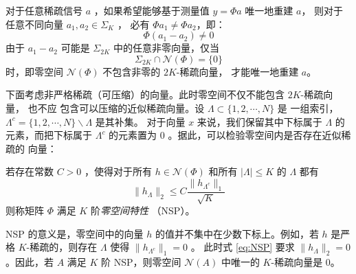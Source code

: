 对于任意稀疏信号 $a$ ，如果希望能够基于测量值 $y = \Phi a$ 唯一地重建 $a$，
则对于任意不同向量 $a_1, a_2 \in \Sigma_K$ ，
必有 $\Phi a_1 \neq \Phi a_2$，即：
\begin{equation}
\Phi (a_1 - a_2) \neq 0
\end{equation}
由于 $a_1 - a_2$ 可能是 $\Sigma_{2K}$ 中的任意非零向量，仅当
\begin{equation}
\Sigma_{2K} \cap \mathcal{N}(\Phi) = \{0\}
\end{equation}
时，即零空间 $\mathcal{N}(\Phi)$ 不包含非零的 $2K$-稀疏向量，
才能唯一地重建 $a$。

下面考虑非严格稀疏（可压缩）的向量。此时零空间不仅不能包含 $2K$-稀疏向量，
也不应
包含可以压缩的近似稀疏向量。设 $\Lambda \subset \{1, 2, \cdots, N\}$ 是
一组索引， $\Lambda^c = \{1,2,\cdots,N\} \backslash \Lambda$ 是其补集。
对于向量 $x$ 来说，我们保留其中下标属于 $\Lambda$ 的元素，而把下标属于
$\Lambda^c$ 的元素置为 $0$ 。据此，可以检验零空间内是否存在近似稀疏的
向量：
\begin{definition}[$K$ 阶零空间特性]
若存在常数 $C > 0$ ，使得对于所有 $h \in \mathcal{N}(\Phi)$ 和所有
$|\Lambda| \leq K$ 的 $\Lambda$ 都有
\begin{equation} \label{eq:NSP}
\|h_\Lambda\|_2 \leq C \frac{\|h_{\Lambda^c}\|_1}{\sqrt{K}}
\end{equation}
则称矩阵 $\Phi$ 满足 $K$ 阶\emph{零空间特性} （NSP）。
\end{definition}
NSP 的意义是，零空间中的向量 $h$ 的值并不集中在少数下标上。例如，若 $h$
是严格 $K$-稀疏的，则存在 $\Lambda$ 使得 $\|h_{\Lambda^c}\|_1 = 0$ 。
此时式 \ref{eq:NSP} 要求 $\|h_\Lambda\|_2 = 0$。因此，若 $A$ 满足 $K$
阶 NSP，则零空间 $\mathcal{N}(A)$ 中唯一的 $K$-稀疏向量是 $0$。

% 

